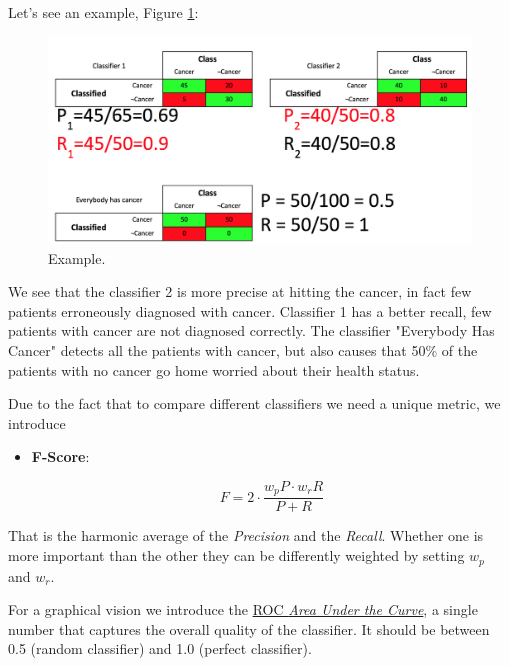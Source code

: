 Let's see an example, Figure \ref{pic:example}:

\begin{figure}[H]%
 \centering
 \includegraphics[width=13cm]{./img/08/example}
 \caption{\label{pic:example} Example.}
\end{figure}

We see that the classifier 2 is more precise at hitting the cancer, in fact few patients erroneously diagnosed with cancer. Classifier 1 has a better recall, few patients with cancer are not diagnosed correctly. 
The classifier "Everybody Has Cancer" detects all the patients with cancer, but also causes that 50\% of the patients with no cancer go home worried about their health status.

Due to the fact that to compare different classifiers we need a unique metric, we introduce

\begin{itemize}
\item \textbf{F-Score}: 

$$F = 2 \cdot \frac{w_p P \cdot w_r R}{P + R}$$
\end{itemize}

That is the harmonic average of the \emph{Precision} and the \emph{Recall}. Whether one is more important than the other  they can be differently weighted by setting $w_p$ and $w_r$.


For a graphical vision we introduce the \href{https://en.wikipedia.org/wiki/Receiver_operating_characteristic}{ROC \emph{Area Under the Curve}}, a single number that captures the overall quality of the classifier. It should be between 0.5 (random classifier) and 1.0 (perfect classifier). 

